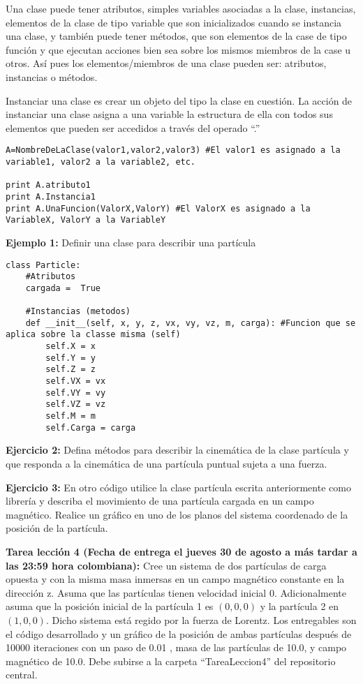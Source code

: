 \documentclass[10.5pt]{article}
\begin{document}
Una clase puede tener atributos, simples variables asociadas a la clase, instancias, elementos de la clase de tipo variable que son inicializados cuando se instancia una clase, y también puede tener métodos, que son elementos de la case de tipo función y que ejecutan acciones bien sea sobre los mismos miembros de la case u otros. Así pues los elementos/miembros de una clase pueden ser: atributos, instancias o métodos.

Instanciar una clase es crear un objeto del tipo la clase en cuestión. La acción de instanciar una clase asigna a una variable la estructura de ella con todos sus elementos que pueden ser accedidos a través del operado ``.''
\begin{verbatim}
A=NombreDeLaClase(valor1,valor2,valor3) #El valor1 es asignado a la variable1, valor2 a la variable2, etc.

print A.atributo1
print A.Instancia1
print A.UnaFuncion(ValorX,ValorY) #El ValorX es asignado a la VariableX, ValorY a la VariableY
\end{verbatim}
 
{\bf Ejemplo 1:} Definir una clase para describir una partícula
\begin{verbatim}
class Particle:
    #Atributos
    cargada =  True
    
    #Instancias (metodos)
    def __init__(self, x, y, z, vx, vy, vz, m, carga): #Funcion que se aplica sobre la classe misma (self)
        self.X = x
        self.Y = y
        self.Z = z
        self.VX = vx
        self.VY = vy
        self.VZ = vz
        self.M = m
        self.Carga = carga
\end{verbatim}

{\bf Ejercicio 2:} Defina métodos para describir la cinemática de la clase partícula y que responda a la cinemática de una partícula puntual sujeta a una fuerza.

{\bf Ejercicio 3:} En otro código utilice la clase partícula escrita anteriormente como librería y describa el movimiento de una partícula cargada en un campo magnético. Realice un gráfico en uno de los planos del sistema coordenado de la posición de la partícula.

{\bf Tarea lección 4 (Fecha de entrega el jueves 30 de agosto a más tardar a las 23:59 hora colombiana):}  Cree un sistema de dos partículas de carga opuesta y con la misma masa inmersas en un campo magnético constante en la dirección z. Asuma que las partículas tienen velocidad inicial 0. Adicionalmente asuma que la posición inicial de la partícula 1 es $(0,0,0)$ y la partícula 2 en $(1,0,0)$. Dicho sistema está regido por la fuerza de Lorentz. Los entregables son el código desarrollado y un gráfico de la posición de ambas partículas después de 10000 iteraciones con un paso de 0.01 , masa de las partículas de 10.0, y campo magnético de 10.0. Debe subirse a la carpeta ``TareaLeccion4'' del repositorio central.
\end{document}
